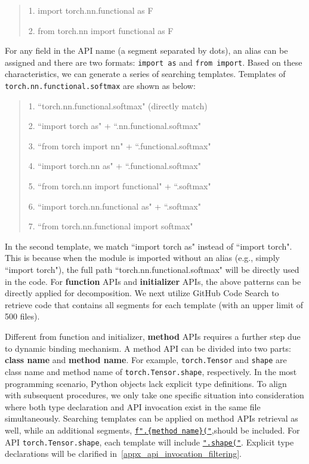 \begin{tcolorbox}[colback=gray!5!white,width=\linewidth, left=-3mm, right=-3mm, top=1mm, bottom=1mm, center]
 \begin{quote}
1. import torch.nn.functional as F

2. from torch.nn import functional as F
\end{quote}
\end{tcolorbox}

For any field in the API name (a segment separated by dots), an alias can be assigned and there are two formats: \texttt{import as} and \texttt{from import}. Based on these characteristics, we can generate a series of searching templates. Templates of \texttt{torch.nn.functional.softmax} are shown as below:
\begin{tcolorbox}[colback=gray!5!white,width=\linewidth, left=-3mm, right=-3mm, top=1mm, bottom=1mm, center]
 \begin{quote}
1. ``torch.nn.functional.softmax" (directly match)

2. ``import torch as" + ``.nn.functional.softmax" 

3. ``from torch import nn" + ``.functional.softmax"

4. ``import torch.nn as" + ``.functional.softmax"

5. ``from torch.nn import functional" + ``.softmax"

6. ``import torch.nn.functional as" + ``.softmax"

7. ``from torch.nn.functional import softmax"
\end{quote}
\end{tcolorbox}

In the second template, we match ``import torch as" instead of ``import torch". This is because when the module is imported without an alias (e.g., simply ``import torch"), the full path ``torch.nn.functional.softmax" will be directly used in the code. 
For \textbf{function} APIs and \textbf{initializer} APIs, the above patterns can be directly applied for decomposition. 
We next utilize GitHub Code Search to retrieve code that contains all segments for each template (with an upper limit of 500 files).

Different from function and initializer, \textbf{method} APIs requires a further step due to dynamic binding mechanism. 
A method API can be divided into two parts: \textbf{class name} and \textbf{method name}. For example, \texttt{torch.Tensor} and \texttt{shape} are class name and method name of \texttt{torch.Tensor.shape}, respectively.
In the most programming scenario, Python objects lack explicit type definitions. 
To align with subsequent procedures, we only take one specific situation into consideration where both type declaration and API invocation exist in the same file simultaneously.
Searching templates can be applied on method APIs retrieval as well, while an additional segments, \underline{\texttt{f".\{method name\}("}},should be included. 
For API \texttt{torch.Tensor.shape}, each template will include \underline{\texttt{".shape("}}.
Explicit type declarations will be clarified in~\cref{appx_api_invocation_filtering}.

